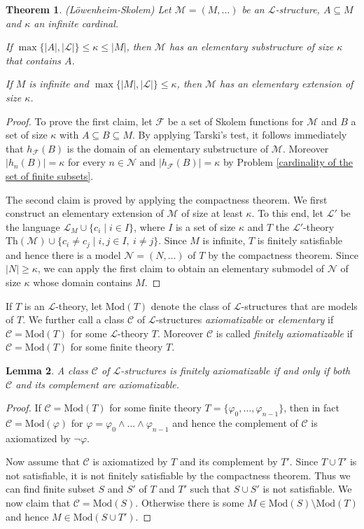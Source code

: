 \documentclass[10pt]{amsart}
\renewcommand{\L}{\mathcal{L}}
\newcommand{\MM}{\mathcal{M}}
\newcommand{\NN}{\mathcal{N}}
\newcommand{\Th}{\mathrm{Th}}
\newcommand{\cC}{\mathcal{C}}
\newcommand{\Mod}{\mathrm{Mod}}
\newtheorem{theorem}{Theorem}[subsection]
\newtheorem{lemma}[theorem]{Lemma}
\theoremstyle{definition}
\theoremstyle{remark}
\newenvironment{enumerate-(1)}{\begin{enumerate}[label={\upshape (\arabic*)}, leftmargin=2pc]}{\end{enumerate}}
\begin{document}
\begin{theorem} (L\"owenheim-Skolem) 
Let $\MM=(M,\dots)$ be an $\L$-structure, $A\subseteq M$ and $\kappa$ an infinite cardinal. 
\begin{enumerate-(1)} 
\item 
If $\max\{|A|,|\L|\}\leq\kappa\leq |M|$, then $\MM$ has an elementary substructure of size $\kappa$ that contains $A$. 
\item 
If $M$ is infinite and $\max\{|M|,|\L|\}\leq\kappa$, then $\MM$ has an elementary extension of size $\kappa$. 
\end{enumerate-(1)} 
\end{theorem} 
\begin{proof} 
To prove the first claim, let $\mathcal{F}$ be a set of Skolem functions for $\MM$ and $B$ a set of size $\kappa$ with $A\subseteq B\subseteq M$. By applying Tarski's test, it follows immediately that $h_{\mathcal{F}}(B)$ is the domain of an elementary substructure of $\MM$. Moreover $|h_n(B)|=\kappa$ for every $n\in\NN$ and $|h_{\mathcal{F}}(B)|=\kappa$ by Problem \ref{cardinality of the set of finite subsets}. 

The second claim is proved by applying the compactness theorem. We first construct an elementary extension of $\MM$ of size at least $\kappa$. To this end, let $\L'$ be the language $\L_M\cup\{c_i\mid i\in I\}$, where $I$ is a set of size $\kappa$ and $T$ the $\L'$-theory $\Th(\MM)\cup\{c_i\neq c_j\mid i,j\in I,\ i\neq j\}$. Since $M$ is infinite, $T$ is finitely satisfiable and hence there is a model $\NN=(N,\dots)$ of $T$ by the compactness theorem. Since $|N|\geq\kappa$, we can apply the first claim to obtain an elementary submodel of $\NN$ of size $\kappa$ whose domain contains $M$. 
\end{proof} 

If $T$ is an $\L$-theory, let $\Mod(T)$ denote the class of $\L$-structures that are models of $T$. We further call a class $\cC$ of $\L$-structures \emph{axiomatizable} or \emph{elementary} if $\cC=\Mod(T)$ for some $\L$-theory $T$. Moreover $\cC$ is called \emph{finitely axiomatizable} if $\cC=\Mod(T)$ for some finite theory $T$. 

\begin{lemma} 
A class $\cC$ of $\L$-structures is finitely axiomatizable if and only if both $\cC$ and its complement are axiomatizable. 
\end{lemma} 
\begin{proof} 
If $\cC=\Mod(T)$ for some finite theory $T=\{\varphi_0,\dots,\varphi_{n-1}\}$, then in fact $\cC=\Mod(\varphi)$ for $\varphi=\varphi_0\wedge\dots\wedge \varphi_{n-1}$ and hence the complement of $\cC$ is axiomatized by $\neg\varphi$.  

Now assume that $\cC$ is axiomatized by $T$ and its complement by $T'$. Since $T\cup T'$ is not satisfiable, it is not finitely satisfiable by the compactness theorem. Thus we can find finite subset $S$ and $S'$ of $T$ and $T'$ such that $S\cup S'$ is not satisfiable. We now claim that $\cC=\Mod(S)$. Otherwise there is some $M\in\Mod(S)\setminus \Mod(T)$ and hence $M\in\Mod(S\cup T')$. 
\end{proof} 
\end{document}
